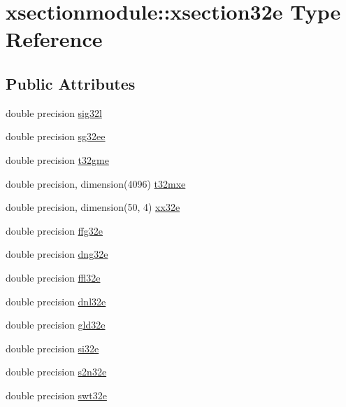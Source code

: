 \hypertarget{structxsectionmodule_1_1xsection32e}{}\section{xsectionmodule\+:\+:xsection32e Type Reference}
\label{structxsectionmodule_1_1xsection32e}
\subsection*{Public Attributes}
\begin{DoxyCompactItemize}
\item 
double precision \hyperlink{structxsectionmodule_1_1xsection32e_a88576561b2393cd846aeb2647c26fa73}{sig32l}
\item 
double precision \hyperlink{structxsectionmodule_1_1xsection32e_a040138ee5d5f2f96847d32d77f540b22}{sg32ee}
\item 
double precision \hyperlink{structxsectionmodule_1_1xsection32e_a6331b2198f7708a59772a1097e2dcf29}{t32gme}
\item 
double precision, dimension(4096) \hyperlink{structxsectionmodule_1_1xsection32e_a013d4375d7e1f0a39b18928275132b12}{t32mxe}
\item 
double precision, dimension(50, 4) \hyperlink{structxsectionmodule_1_1xsection32e_ad6b23db95defedb80586665360850ab0}{xx32e}
\item 
double precision \hyperlink{structxsectionmodule_1_1xsection32e_a5480f865beaffb122c5f1f15d321c61e}{ffg32e}
\item 
double precision \hyperlink{structxsectionmodule_1_1xsection32e_a6507da76d141487639bbf6f3870349f5}{dng32e}
\item 
double precision \hyperlink{structxsectionmodule_1_1xsection32e_a40dbcf7797a2bba88c79d9665733b028}{ffl32e}
\item 
double precision \hyperlink{structxsectionmodule_1_1xsection32e_ae74c62e1ea6d6433b7682c4684cb7988}{dnl32e}
\item 
double precision \hyperlink{structxsectionmodule_1_1xsection32e_ac8ffce1d9d35ac46a1804eafcc2ba2d1}{gld32e}
\item 
double precision \hyperlink{structxsectionmodule_1_1xsection32e_a9541d829e5972b46978193df06dad46e}{si32e}
\item 
double precision \hyperlink{structxsectionmodule_1_1xsection32e_a8a6aba5640506fd1cde4639e42b7f786}{s2n32e}
\item 
double precision \hyperlink{structxsectionmodule_1_1xsection32e_a6e587c00c4e3d1786dafc9d91016612c}{swt32e}

\end{DoxyCompactItemize}
